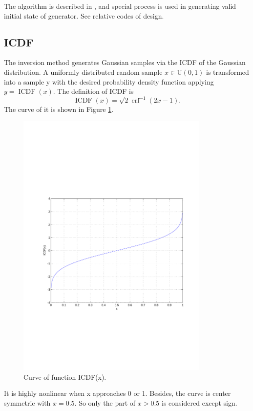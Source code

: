 \documentclass[a4paper, titlepage]{article}
\DeclareMathOperator{\ICDF}{ICDF}
\DeclareMathOperator{\erf}{erf}
\begin{document}
The algorithm is described in \cite{lecuyer1}, and special process is used
in generating valid initial state of generator.
See relative codes of design.

\subsection{ICDF}
The inversion method generates Gaussian samples via the ICDF of
the Gaussian distribution.
A uniformly distributed random sample $x \in \mathrm{U}(0,1)$ is
transformed into a sample y with the desired
probability density function applying $y = \ICDF(x)$.
The definition of ICDF is
\begin{equation}
    \ICDF(x) = \sqrt{2}\erf^{-1}(2x-1).
\end{equation}
The curve of it is shown in Figure \ref{fig:icdfplot}.
\begin{figure}[!htbp]
\centering
\includegraphics[width=0.85\textwidth]{icdfplot.pdf}
\caption{Curve of function ICDF(x).}
\label{fig:icdfplot}
\end{figure}

It is highly nonlinear when x approaches 0 or 1.
Besides, the curve is center symmetric with $x = 0.5$.
So only the part of $x > 0.5$ is considered except sign.
\end{document}
